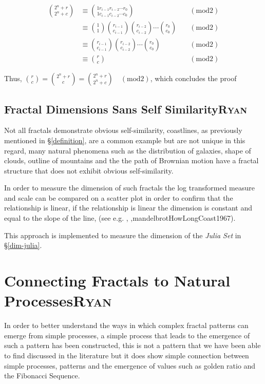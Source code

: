 \documentclass[a4paper,11pt,twoside]{article}
\begin{document}
\begin{align*}
\binom{2^n + r}{2^n + c} &\equiv \binom{1r_{i-1}r_{i-2} \cdots r_{0}}{1c_{i-1}c_{i-2} \cdots c_{0}} \quad &(\text{mod} 2)\\
&\equiv \binom{1}{1}\binom{r_{i-1}}{c_{i-1}}\binom{r_{i-2}}{c_{i-2}} \cdots \binom{r_0}{c_0} \quad &(\text{mod} 2)\\
&\equiv \binom{r_{i-1}}{c_{i-1}}\binom{r_{i-2}}{c_{i-2}} \cdots \binom{r_0}{c_0} \quad &(\text{mod} 2)\\
&\equiv \binom{r}{c} \quad &(\text{mod} 2)
\end{align*}

Thus, \(\binom{r}{c} = \binom{2^n + r}{c} = \binom{2^n + r}{2^n + c} \quad (\text{mod} 2)\), which concludes the proof

\subsection{Fractal Dimensions Sans Self Similarity\hfill{}\textsc{Ryan}}
\label{sans-self}
Not all fractals demonstrate obvious self-similarity, coastlines, as previously
mentioned in \S \ref{definition}, are a common example but are not unique in this
regard, many natural phenomena such as the distribution of galaxies, shape of
clouds, outline of mountains and the the path of Brownian motion have a fractal structure
 \cite[Ch. 2]{gouyetPhysicsFractalStructures1996} that does not exhibit
obvious self-similarity.

In order to measure the dimension of such fractals the log transformed measure
and scale can be compared on a scatter plot in order to confirm that the
relationship is linear, if the relationship is linear the dimension is constant
and equal to the slope of the line, (see e.g. \cite[\S 4.2]{vicsekFractalGrowthPhenomena1992},
\cite{sandersonFractalsAreTypically2017}
,mandelbrotHowLongCoast1967).

This approach is implemented to measure the dimension of the \emph{Julia Set} in \S \ref{dim-julia}.


\newpage
\section{Connecting Fractals to Natural Processes\hfill{}\textsc{Ryan}}
\label{my-fractal}
In order to better understand the ways in which complex fractal patterns can
emerge from simple processes, a simple process that
leads to the emergence of such a pattern has been constructed, this is not a pattern that we have been able to find discussed in the literature but it does show simple connection between simple processes, patterns and the emergence of values such as golden ratio and the Fibonacci Sequence.
\end{document}

